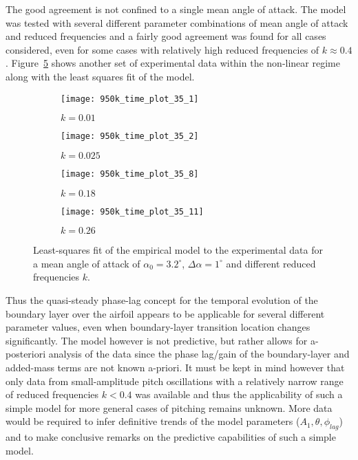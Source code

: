 The good agreement is not confined to a single mean angle of attack. The model was tested with several different parameter combinations of mean angle of attack and reduced frequencies and a fairly good agreement was found for all cases considered, even for some cases with relatively high reduced frequencies of $k\approx0.4$. Figure~\ref{fig:model_fits2} shows another set of experimental data within the non-linear regime along with the least squares fit of the model.
\begin{figure}[h]
	\centering
	\begin{subfigure}[b]{0.45\textwidth}
		\centering
		\texttt{[image: 950k\_time\_plot\_35\_1]}
		\caption{$k=0.01$}
		\label{fig:k_01_2}
	\end{subfigure}
	\begin{subfigure}[b]{0.45\textwidth}
		\centering
		\texttt{[image: 950k\_time\_plot\_35\_2]}
		\caption{$k=0.025$}
		\label{fig:k_025_2}
	\end{subfigure}
	\begin{subfigure}[b]{0.45\textwidth}
		\centering
		\texttt{[image: 950k\_time\_plot\_35\_8]}
		\caption{$k=0.18$}
		\label{fig:k_18_2}
	\end{subfigure}
	\begin{subfigure}[b]{0.45\textwidth}
		\centering
		\texttt{[image: 950k\_time\_plot\_35\_11]}
		\caption{$k=0.26$}
		\label{fig:k_2_2}
	\end{subfigure}	
	\caption{Least-squares fit of the empirical model to the experimental data for a mean angle of attack of $\alpha_{0}=3.2^{\circ}$, $\Delta\alpha=1^{\circ}$ and different reduced frequencies $k$.}
	\label{fig:model_fits2}
\end{figure}
Thus the quasi-steady phase-lag concept for the temporal evolution of the boundary layer over the airfoil appears to be applicable for several different parameter values, even when boundary-layer transition location changes significantly. The model however is not predictive, but rather allows for a-posteriori analysis of the data since the phase lag/gain of the boundary-layer and added-mass terms are not known a-priori. It must be kept in mind however that only data from small-amplitude pitch oscillations with a relatively narrow range of reduced frequencies $k<0.4$ was available and thus the applicability of such a simple model for more general cases of pitching remains unknown. More data would be required to infer definitive trends of the model parameters ($A_{1},\theta,\phi_{lag}$) and to make conclusive remarks on the predictive capabilities of such a simple model.

